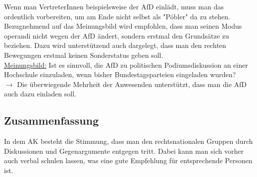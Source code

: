     Wenn man VertreterInnen beispielsweise der AfD einlädt, muss man das ordentlich vorbereiten, um am Ende nicht selbst als "Pöbler" da zu stehen. \\

    Bezugnehmend auf das Meinungsbild wird empfohlen, dass man seinen Modus operandi nicht wegen der AfD ändert, sondern erstmal den Grundsätze zu beziehen. Dazu wird unterstützend auch dargelegt, dass man den rechten Bewegungen erstmal keinen Sonderstatus geben soll. \\

    \underline{Meinungsbild:} Ist es sinnvoll, die AfD zu politischen Podiumsdiskussion an einer Hochschule einzuladen, wenn bisher Bundestagsparteien eingeladen wurden? \\
    $\rightarrow$ Die überwiegende Mehrheit der Anwesenden unterstützt, dass man die AfD auch dazu einladen soll.

  \subsection*{Zusammenfassung}
    In dem AK besteht die Stimmung, dass man den rechtsnationalen Gruppen durch Diskussionen und Gegenargumente entgegen tritt. Dabei kann man sich vorher auch verbal schulen lassen, was eine gute Empfehlung für entsprechende Personen ist.
